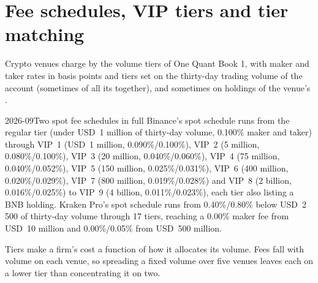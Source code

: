 \section{Fee schedules, VIP tiers and tier matching}

Crypto venues charge by the volume tiers of One Quant Book 1, with maker and taker rates in basis points and tiers set on the
thirty-day trading volume of the account (sometimes of all its  together), and sometimes on holdings of the venue's
.

\begin{dated}{2026-09}{Two spot fee schedules in full}\label{dat:m3:getting-access-crypto-venues:tiers}
Binance's spot schedule runs from the regular tier (under USD~1 million of thirty-day volume, 0.100\% maker and taker) through VIP~1
(USD~1 million, 0.090\%/0.100\%), VIP~2 (5 million, 0.080\%/0.100\%), VIP~3 (20 million, 0.040\%/0.060\%), VIP~4 (75 million,
0.040\%/0.052\%), VIP~5 (150 million, 0.025\%/0.031\%), VIP~6 (400 million, 0.020\%/0.029\%), VIP~7 (800 million, 0.019\%/0.028\%) and
VIP~8 (2 billion, 0.016\%/0.025\%) to VIP~9 (4 billion, 0.011\%/0.023\%), each tier also listing a BNB holding. Kraken Pro's spot schedule
runs from 0.40\%/0.80\% below USD~2\,500 of thirty-day volume through 17 tiers, reaching a 0.00\% maker fee from USD~10 million and
0.00\%/0.05\% from USD~500 million.
\end{dated}

Tiers make a firm's cost a function of how it allocates its volume. Fees fall with volume on each venue, so spreading a fixed volume
over five venues leaves each on a lower tier than concentrating it on two.

